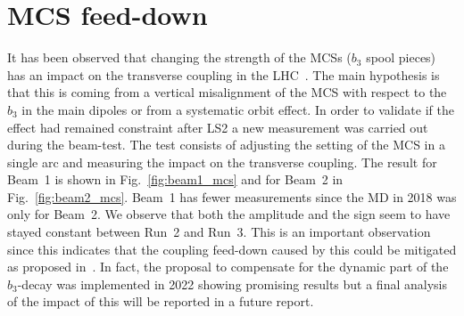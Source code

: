 \documentclass[a4paper]{cernatsnote}
\begin{document}

\section{MCS feed-down}
It has been observed that changing the strength of the MCSs ($b_3$ spool pieces) has an impact on the transverse coupling in the LHC~\cite{counter_acting_coupling_decay}. The main hypothesis is that this is coming from a vertical misalignment of the MCS with respect to the $b_3$ in the main dipoles or from a systematic orbit effect. In order to validate if the effect had remained constraint after LS2 a new measurement was carried out during the beam-test. The test consists of adjusting the setting of the MCS in a single arc and measuring the impact on the transverse coupling. The result for Beam~1 is shown in Fig.~\ref{fig:beam1_mcs} and for Beam~2 in  Fig.~\ref{fig:beam2_mcs}. Beam~1 has fewer measurements since the MD in 2018 was only for Beam~2. We observe that both the amplitude and the sign seem to have stayed constant between Run~2 and Run~3. This is an important observation since this indicates that the coupling feed-down caused by this could be mitigated as proposed in~\cite{counter_acting_coupling_decay}. In fact, the proposal to compensate for the dynamic part of the $b_3$-decay was implemented in 2022 showing promising results but a final analysis of the impact of this will be reported in a future report.
\end{document}
